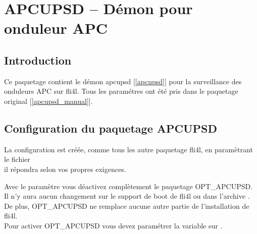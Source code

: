 \section {APCUPSD -- Démon pour onduleur APC}

\subsection{Introduction}

  Ce paquetage contient le démon apcupsd {[\ref{apcupsd}]} pour la surveillance
  des onduleurs APC sur fli4l. Tous les paramétres ont été pris dans le paquetage
  original {[\ref{apcupsd_manual}]}.

\subsection{Configuration du paquetage APCUPSD}

  La configuration est créée, comme tous les autre paquetage fli4l, en paramètrant
  le fichier\\
   il répondra selon vos propres
  exigences.

\begin{description}


  Avec le paramètre  vous déactivez complètement le paquetage OPT\_APCUPSD.
  Il n'y aura aucun changement sur le support de boot de fli4l  ou dans
  l'archive . De plus, OPT\_APCUPSD ne remplace aucune autre partie
  de l'installation de fli4l.\\
  Pour activer OPT\_APCUPSD vous devez paramétrer la variable  sur .

\end{description}

